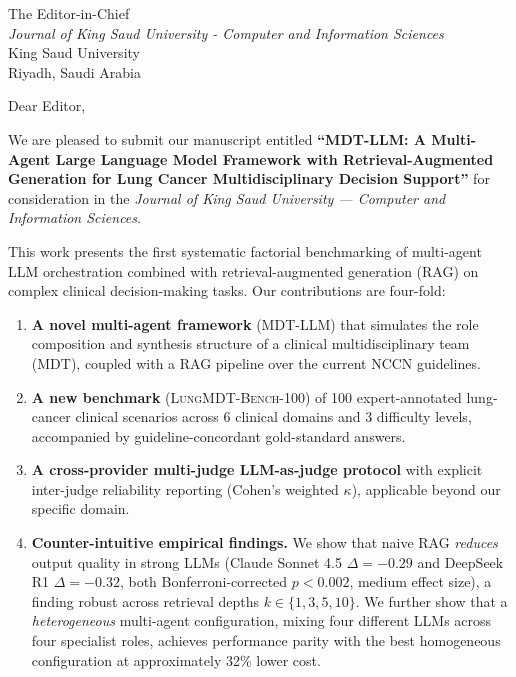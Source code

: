 \documentclass[11pt,a4paper]{letter}
\begin{document}
\begin{letter}{%
The Editor-in-Chief\\
\textit{Journal of King Saud University - Computer and Information Sciences}\\
King Saud University\\
Riyadh, Saudi Arabia}

\opening{Dear Editor,}

We are pleased to submit our manuscript entitled \textbf{``MDT-LLM:
A Multi-Agent Large Language Model Framework with Retrieval-Augmented
Generation for Lung Cancer Multidisciplinary Decision Support''} for
consideration in the \textit{Journal of King Saud University --- Computer
and Information Sciences}.

This work presents the first systematic factorial benchmarking of
multi-agent LLM orchestration combined with retrieval-augmented
generation (RAG) on complex clinical decision-making tasks. Our
contributions are four-fold:

\begin{enumerate}
\item \textbf{A novel multi-agent framework} (\textsc{MDT-LLM}) that
simulates the role composition and synthesis structure of a clinical
multidisciplinary team (MDT), coupled with a RAG pipeline over the
current NCCN guidelines.

\item \textbf{A new benchmark} (\textsc{LungMDT-Bench-100}) of 100
expert-annotated lung-cancer clinical scenarios across 6 clinical
domains and 3 difficulty levels, accompanied by guideline-concordant
gold-standard answers.

\item \textbf{A cross-provider multi-judge LLM-as-judge protocol} with
explicit inter-judge reliability reporting (Cohen's weighted $\kappa$),
applicable beyond our specific domain.

\item \textbf{Counter-intuitive empirical findings.} We show that naive
RAG \emph{reduces} output quality in strong LLMs (Claude Sonnet 4.5
$\Delta{=}{-}0.29$ and DeepSeek R1 $\Delta{=}{-}0.32$, both
Bonferroni-corrected $p<0.002$, medium effect size), a finding robust
across retrieval depths $k \in \{1, 3, 5, 10\}$. We further show that a
\emph{heterogeneous} multi-agent configuration, mixing four different
LLMs across four specialist roles, achieves performance parity with
the best homogeneous configuration at approximately 32\% lower cost.
\end{enumerate}


\end{letter}
\end{document}
